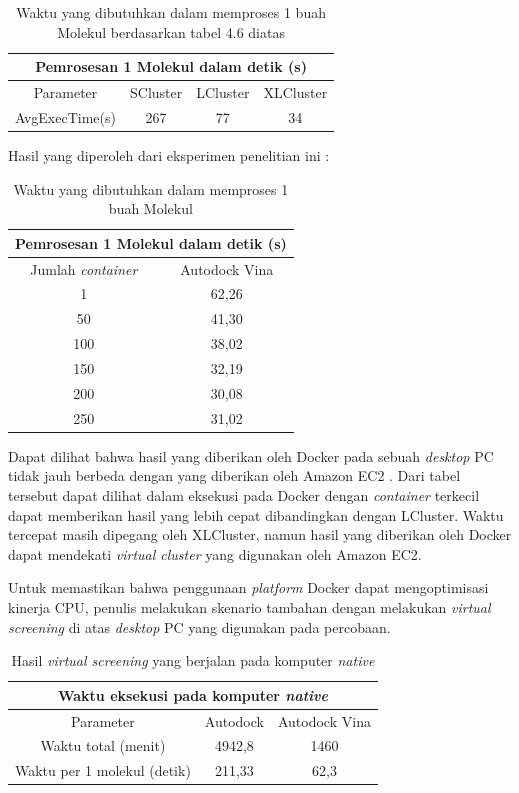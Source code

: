 \begin{table}
	\centering
	\begin{tabular}{|c|c|c|c|}
		\hline
		\multicolumn{4}{|c|}{Pemrosesan 1 Molekul dalam detik (s)} \\ \hline
		Parameter & SCluster & LCluster & XLCluster \\ \hline
		AvgExecTime(s) & 267 & 77 & 34 \\ \hline
	\end{tabular}
	\caption{Waktu yang dibutuhkan dalam memproses 1 buah Molekul berdasarkan tabel 4.6 diatas}
	\label{my-label}
\end{table}
Hasil yang diperoleh dari eksperimen penelitian ini :
\begin{table}
	\centering
	\begin{tabular}{|c|c|}
		\hline
		\multicolumn{2}{|c|}{Pemrosesan 1 Molekul dalam detik (s)} \\ \hline
		Jumlah \textit{container} & Autodock Vina \\ \hline
		1 & 62,26 \\ \hline  
		50 & 41,30 \\ \hline
		100 & 38,02 \\ \hline
		150 & 32,19 \\ \hline
		200 & 30,08 \\ \hline
		250 & 31,02 \\ \hline
	\end{tabular}
	\caption{Waktu yang dibutuhkan dalam memproses 1 buah Molekul}
	\label{my-label}
\end{table}

Dapat dilihat bahwa hasil yang diberikan oleh Docker pada sebuah \textit{desktop} PC tidak jauh berbeda dengan yang diberikan oleh Amazon EC2 . Dari tabel tersebut dapat dilihat dalam eksekusi pada Docker dengan \textit{container} terkecil dapat memberikan hasil yang lebih cepat dibandingkan dengan LCluster. Waktu tercepat masih dipegang oleh XLCluster, namun hasil yang diberikan oleh Docker dapat mendekati \textit{virtual cluster} yang digunakan oleh Amazon EC2.

Untuk memastikan bahwa penggunaan \textit{platform} Docker dapat mengoptimisasi kinerja CPU, penulis melakukan skenario tambahan dengan melakukan \textit{virtual screening} di atas \textit{desktop} PC yang digunakan pada percobaan.
\begin{table}
	\centering
	\label{my-label}
	\begin{tabular}{|c|c|c|}
		\hline
		\multicolumn{3}{|c|}{Waktu eksekusi pada komputer \textit{native}} \\ \hline
		Parameter & Autodock & Autodock Vina \\ \hline
		Waktu total (menit) & 4942,8 & 1460 \\ \hline
		Waktu per 1 molekul (detik) & 211,33 & 62,3 \\ \hline
	\end{tabular}
		\caption{Hasil \textit{virtual screening} yang berjalan pada komputer \textit{native}}
\end{table}

